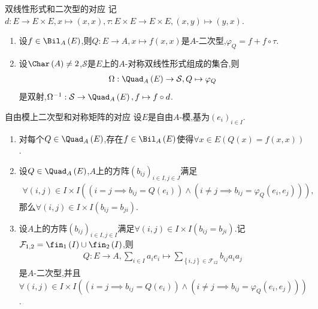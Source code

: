 \begin{proposition}{双线性形式和二次型的对应}{}
	记$d:E\to E\times E,x\mapsto\left(x,x\right),\tau:E\times E\to E\times E,\left(x,y\right)\mapsto\left(y,x\right)$.
	\begin{enumerate}
		\item 设$f\in\Bil_{A}\left(E\right)$,则$Q:E\to A,x\mapsto f\left(x,x\right)$是$A$-二次型,$\varphi_{Q}=f+f\circ\tau$.
		\item 设$\Char\left(A\right)\neq 2$,$\mathcal{S}$是$E$上的$A$-对称双线性形式组成的集合,则
		\begin{align*}
			\Omega:\Quad_{A}\left(E\right)\to\mathcal{S},Q\mapsto\varphi_{Q}
		\end{align*}
		是双射,$\Omega^{-1}:\mathcal{S}\to\Quad_{A}\left(E\right),f\mapsto f\circ d$.
	\end{enumerate}
\end{proposition}

\begin{proposition}{自由模上二次型和对称矩阵的对应}{}
	设$E$是自由$A$-模,基为$\left(e_{i}\right)_{i\in I}$.
	\begin{enumerate}
		\item 对每个$Q\in\Quad_{A}\left(E\right)$,存在$f\in\Bil_{A}\left(E\right)$使得$\forall x\in E\left(Q\left(x\right)=f\left(x,x\right)\right)$.
		\item 设$Q\in\Quad_{A}\left(E\right)$,$A$上的方阵$\left(b_{ij}\right)_{i\in I,j\in J}$满足
		\begin{align*}
			\forall\left(i,j\right)\in I\times I\left(\left(i=j\implies b_{ij}=Q\left(e_{i}\right)\right)\wedge\left(i\neq j\implies b_{ij}=\varphi_{Q}\left(e_{i},e_{j}\right)\right)\right),
		\end{align*}
		那么$\forall\left(i,j\right)\in I\times I\left(b_{ij}=b_{ji}\right)$.
		\item 设$A$上的方阵$\left(b_{ij}\right)_{i\in I,j\in I}$满足$\forall\left(i,j\right)\in I\times I\left(b_{ij}=b_{ji}\right)$.记$\mathcal{F}_{1,2}=\fin_{1}\left(I\right)\cup\fin_{2}\left(I\right)$,则
		\begin{align*}
			Q:E\to A,\sum\limits_{i\in I}a_{i}e_{i}\mapsto\sum\limits_{\left\{i,j\right\}\in\mathcal{F}_{12}}b_{ij}a_{i}a_{j}
		\end{align*}
		是$A$-二次型,并且$\forall\left(i,j\right)\in I\times I\left(\left(i=j\implies b_{ij}=Q\left(e_{i}\right)\right)\wedge\left(i\neq j\implies b_{ij}=\varphi_{Q}\left(e_{i},e_{j}\right)\right)\right)$.
	\end{enumerate}
\end{proposition}

